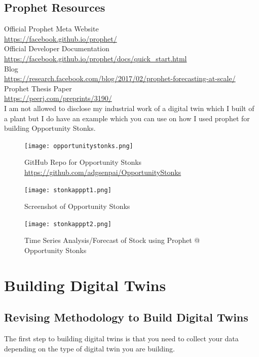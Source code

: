 \subsection{Prophet Resources}
Official Prophet Meta Website \\ 
\url{https://facebook.github.io/prophet/} \\
Official Developer Documentation \\
\url{https://facebook.github.io/prophet/docs/quick_start.html} \\
Blog \\
\url{https://research.facebook.com/blog/2017/02/prophet-forecasting-at-scale/}
Prophet Thesis Paper \\
\url{https://peerj.com/preprints/3190/} \\ 
I am not allowed to disclose my industrial work of a digital twin which I built of a plant but I do have an example which you can use on how I used prophet for building Opportunity Stonks. \\ 

\begin{figure}[H]
    \centering
    \texttt{[image: opportunitystonks.png]}
    \caption{GitHub Repo for Opportunity Stonks \url{https://github.com/adgsenpai/OpportunityStonks}}
    \label{fig:opportunitystonks}
\end{figure} 

\begin{figure}[H]
    \centering
    \texttt{[image: stonkapppt1.png]}
    \caption{Screenshot of Opportunity Stonks}
    \label{fig:opportunitystonks2}
\end{figure} 

\begin{figure}[H]
    \centering
    \texttt{[image: stonkapppt2.png]}
    \caption{Time Series Analysis/Forecast of Stock using Prophet @ Opportunity Stonks}
    \label{fig:opportunitystonks3}
\end{figure}

\section{Building Digital Twins}

\subsection{Revising Methodology to Build Digital Twins}

The first step to building digital twins is that you need to collect your data depending on the type of digital twin you are building. \\

